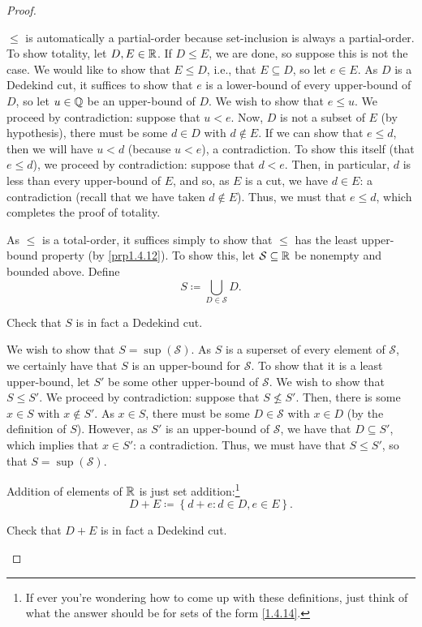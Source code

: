 \begin{thm}
\begin{proof}
\begin{savenotes}
$\leq$ is automatically a partial-order because set-inclusion is always a partial-order.  To show totality, let $D,E\in \mathbb{R}$.  If $D\leq E$, we are done, so suppose this is not the case.  We would like to show that $E\leq D$, i.e., that $E\subseteq D$, so let $e\in E$.  As $D$ is a Dedekind cut, it suffices to show that $e$ is a lower-bound of every upper-bound of $D$, so let $u\in \mathbb{Q}$ be an upper-bound of $D$.  We wish to show that $e\leq u$.  We proceed by contradiction:  suppose that $u<e$.  Now, $D$ is not a subset of $E$ (by hypothesis), there must be some $d\in D$ with $d\notin E$.  If we can show that $e\leq d$, then we will have $u<d$ (because $u<e$), a contradiction.  To show this itself (that $e\leq d$), we proceed by contradiction:  suppose that $d<e$.  Then, in particular, $d$ is less than every upper-bound of $E$, and so, as $E$ is a cut, we have $d\in E$:  a contradiction (recall that we have taken $d\notin E$).  Thus, we must that $e\leq d$, which completes the proof of totality.

As $\leq$ is a total-order, it suffices simply to show that $\leq$ has the least upper-bound property (by \cref{prp1.4.12}).  To show this, let $\mathcal{S}\subseteq \mathbb{R}$ be nonempty and bounded above.  Define
\begin{equation}
S\coloneqq \bigcup _{D\in \mathcal{S}}D.
\end{equation}
\begin{exr}
Check that $S$ is in fact a Dedekind cut.
\end{exr}
We wish to show that $S=\sup \left( \mathcal{S}\right)$.  As $S$ is a superset of every element of $\mathcal{S}$, we certainly have that $S$ is an upper-bound for $\mathcal{S}$.  To show that it is a least upper-bound, let $S'$ be some other upper-bound of $\mathcal{S}$.  We wish to show that $S\leq S'$.  We proceed by contradiction:  suppose that $S\not \leq S'$.  Then, there is some $x\in S$ with $x\notin S'$.  As $x\in S$, there must be some $D\in \mathcal{S}$ with $x\in D$ (by the definition of $S$).  However, as $S'$ is an upper-bound of $\mathcal{S}$, we have that $D\subseteq S'$, which implies that $x\in S'$:  a contradiction.  Thus, we must have that $S\leq S'$, so that $S=\sup \left( \mathcal{S}\right)$.

Addition of elements of $\mathbb{R}$ is just set addition:\footnote{If ever you're wondering how to come up with these definitions, just think of what the answer should be for sets of the form \eqref{1.4.14}.}
\begin{equation}
D+E\coloneqq \left\{ d+e:d\in D,e\in E\right\} .
\end{equation}
\begin{exr}
Check that $D+E$ is in fact a Dedekind cut.
\end{exr}


\end{savenotes}
\end{proof}
\end{thm}
